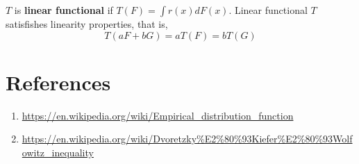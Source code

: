 \begin{definition}
    $T$ is \textbf{linear functional} if $T(F) = \int r(x) dF(x)$. Linear functional $T$ satisfishes linearity properties, that is,
    \[T(aF + bG) = aT(F) = bT(G) \]
\end{definition}

\section{References}
\begin{enumerate}
    \item \url{https://en.wikipedia.org/wiki/Empirical_distribution_function}
    \item \url{https://en.wikipedia.org/wiki/Dvoretzky%E2%80%93Kiefer%E2%80%93Wolfowitz_inequality}
\end{enumerate}
